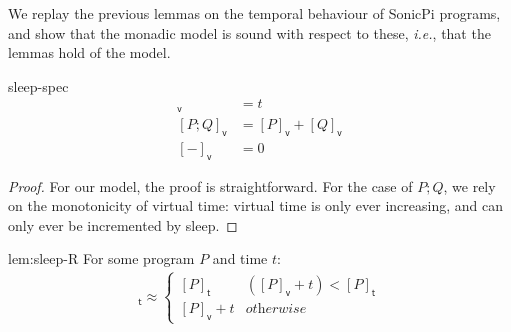\documentclass[preprint]{sigplanconf}
\newcommand{\note}[1]{{\color{blue}{#1}}}
\theoremstyle{definition}
\newcommand{\sleep}{\mathsf{sleep}\;}
\newcommand{\lang}{SonicPi}
\newcommand{\vtime}[1]{[#1]_{\mathsf{v}}}
\newcommand{\etime}[1]{[#1]_{\mathsf{t}}}
\newcommand{\ie}{\emph{i.e.}}
\begin{document}
We replay the previous lemmas on the temporal behaviour of \lang{} programs,
and show that the monadic model is sound with respect to these, \ie{},
that the lemmas hold of the model. 

\noindent
\begin{repdefinition}{sleep-spec}
\begin{align*}
\vtime{\sleep t} & = t \\ 
\vtime{P; Q} & = \vtime{P} + \vtime{Q} \\
\vtime{-} & = 0
\end{align*}
\end{repdefinition}

\begin{proof}
For our model, the proof is straightforward. For the case of
$P; Q$, we rely on the monotonicity of virtual time: virtual
time is only ever increasing, and can only ever be incremented by sleep. 
\note{Could put more here}
\end{proof}

\begin{replemma}{lem:sleep-R}
For some program $P$ and time $t$: 
\begin{align*}
\etime{P; \sleep{} t} \approx
 \begin{cases}
   \etime{P} & (\vtime{P} + t) < \etime{P} \\
   \vtime{P} + t  & \textit{otherwise}
 \end{cases}
\end{align*}
\end{replemma}
\end{document}
